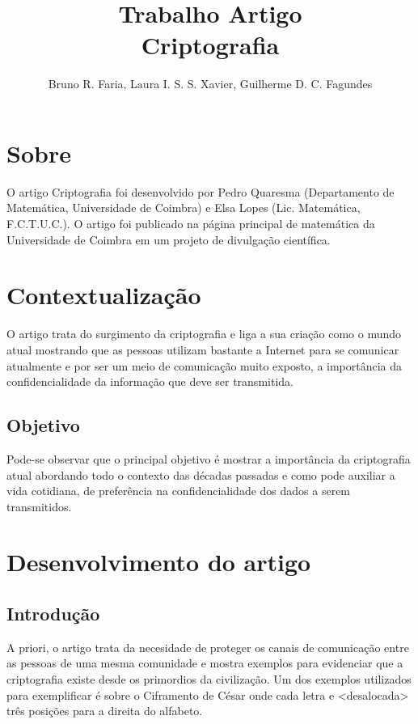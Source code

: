 \documentclass[12pt]{article}
\title{Trabalho Artigo \\ Criptografia}
\author{Bruno R. Faria\inst{1}, Laura I. S. S. Xavier\inst{2}, Guilherme D. C. Fagundes\inst{3}}
\begin{document}
 
\maketitle

\section{Sobre}
O artigo Criptografia foi desenvolvido por Pedro Quaresma (Departamento de Matemática, Universidade de Coimbra) e Elsa Lopes (Lic. Matemática, F.C.T.U.C.). O artigo foi publicado na página principal de matemática da Universidade de Coimbra em um projeto de divulgação científica.

\section{Contextualização}
O artigo trata do surgimento da criptografia e liga a sua criação como o mundo atual mostrando que as pessoas utilizam bastante a Internet para se comunicar atualmente e por ser um meio de comunicação muito exposto, a importância da confidencialidade da informação que deve ser transmitida.

\subsection{Objetivo}
Pode-se observar que o principal objetivo é mostrar a importância da criptografia atual abordando todo o contexto das décadas passadas e como pode auxiliar a vida cotidiana, de preferência na confidencialidade dos dados a serem transmitidos.

\section{Desenvolvimento do artigo}
\subsection{Introdução}
A priori, o artigo trata da necesidade de proteger os canais de comunicação entre as pessoas de uma mesma comunidade e mostra exemplos para evidenciar que a criptografia existe desde os primordios da civilização. Um dos exemplos utilizados para exemplificar é sobre o Ciframento de César onde cada letra e <desalocada> três posições para a direita do alfabeto.
\end{document}
